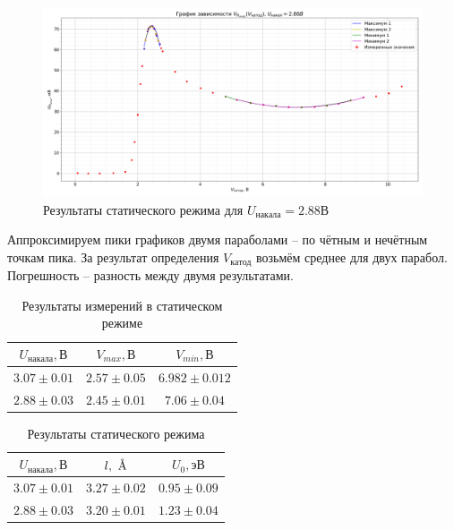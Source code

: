 \documentclass[a4paper, 12pt]{article}
\begin{document}
            \begin{figure}[!ht]
                \centering
                \includegraphics[width = 0.9\linewidth]{img/plot_static_2.88.png}
                \caption{Результаты статического режима для $U_{накала} = 2.88В$}
                \label{}
            \end{figure}

            Аппроксимируем пики графиков двумя параболами -- по чётным и нечётным точкам пика. За результат определения $V_{катод}$ возьмём среднее для двух парабол. Погрешность -- разность между двумя результатами.

            \begin{table}[!ht]
                \centering
                \begin{tabular}{|c|c|c|}
                    \hline

                    $U_{накала}, В$ & $V_{max}, В$ & $V_{min}, В$\\ \hline
                    $3.07 \pm 0.01$ & $2.57 \pm 0.05$ & $6.982 \pm 0.012$\\ \hline
                    $2.88 \pm 0.03$ & $2.45 \pm 0.01$ & $7.06 \pm 0.04$\\ \hline

                \end{tabular}
                \caption{Результаты измерений в статическом режиме}
                \label{}
            \end{table}

            \begin{table}[!ht]
                \centering
                \begin{tabular}{|c|c|c|}
                    \hline

                    $U_{накала}, В$ & $l, \textup{~\AA}$ & $U_0, эВ$\\ \hline
                    $3.07 \pm 0.01$ & $3.27 \pm 0.02$ & $0.95 \pm 0.09$\\ \hline
                    $2.88 \pm 0.03$ & $3.20 \pm 0.01$ & $1.23 \pm 0.04$\\ \hline

                \end{tabular}
                \caption{Результаты статического режима}
                \label{}
            \end{table}
\end{document}
